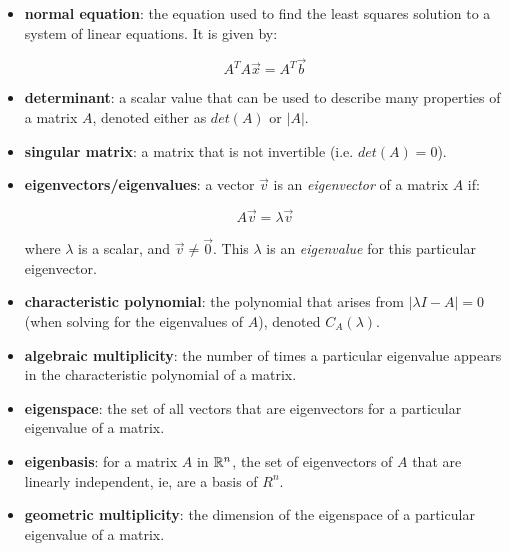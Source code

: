 \documentclass[12pt]{article}
\begin{document}
{\begin{itemize}
        \item \textbf{normal equation}: the equation used to find the least squares solution to a system of linear equations. It is given by:
        
        \begin{equation}
            A^TA\Vec{x} = A^T\Vec{b}
        \end{equation}

        \item \textbf{determinant}: a scalar value that can be used to describe many properties of a matrix $A$, denoted either as $det(A)$ or $|A|$.
        
        \item \textbf{singular matrix}: a matrix that is not invertible (i.e. $det(A) = 0$).

        \item \textbf{eigenvectors/eigenvalues}: a vector $\vec{v}$ is an \textit{eigenvector} of a matrix $A$ if:
        
        \begin{equation}
            A\vec{v} = \lambda \vec{v}
        \end{equation}

        where $\lambda$ is a scalar, and $\vec{v}\neq\vec{0}$. This $\lambda$ is an \textit{eigenvalue} for this particular eigenvector.

        \item \textbf{characteristic polynomial}: the polynomial that arises from $|\lambda I - A| = 0$ (when solving for the eigenvalues of $A$), denoted $C_A(\lambda)$.
        
        \item \textbf{algebraic multiplicity}: the number of times a particular eigenvalue appears in the characteristic polynomial of a matrix.
        
        \item \textbf{eigenspace}: the set of all vectors that are eigenvectors for a particular eigenvalue of a matrix.
        
        \item \textbf{eigenbasis}: for a matrix $A$ in $\mathbb{R}^n$, the set of eigenvectors of $A$ that are linearly independent, ie, are a basis of $R^n$.
        
        \item \textbf{geometric multiplicity}: the dimension of the eigenspace of a particular eigenvalue of a matrix.
        

\end{itemize}}
\end{document}
